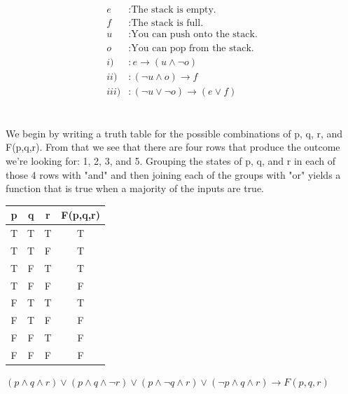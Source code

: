 \documentclass[11pt]{article}
\begin{document}
\subsection{} %
\begin{align*}
	e &: \text{The stack is empty.} \\
	f &: \text{The stack is full.} \\
	u &: \text{You can push onto the stack.} \\
	o &: \text{You can pop from the stack.} \\
	i) &: e \rightarrow (u \land \neg{o}) \\
	ii) &: (\neg{u} \land o) \rightarrow f \\
	iii) &: (\neg{u} \lor \neg{o}) \rightarrow (e \lor f)
\end{align*}

\section{} %
We begin by writing a truth table for the possible combinations of p, q, r, and F(p,q,r). From that we see that there are four rows that produce the outcome we're looking for: 1, 2, 3, and 5. Grouping the states of p, q, and r in each of those 4 rows with "and" and then joining each of the groups with "or" yields a function that is true when a majority of the inputs are true.
\begin{center}
\begin{tabular}{ c|c|c|c } 
	p & q & r & F(p,q,r) \\
	\hline
	T & T & T & T \\
	T & T & F & T \\
	T & F & T & T \\
	T & F & F & F \\
	F & T & T & T \\
	F & T & F & F \\
	F & F & T & F \\
	F & F & F & F \\
\end{tabular}
\end{center}
\begin{center} 
$(p \land q \land r) \lor (p \land q \land \neg{r}) \lor (p \land \neg{q} \land r) \lor (\neg{p} \land q \land r) \rightarrow F(p,q,r)$
\end{center}
\end{document}
